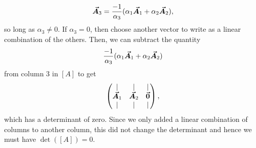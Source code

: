 \documentclass[12pt]{article} %
\begin{document}
\begin{solution}
\begin{enumerate}[(a)]
\[
\boldsymbol{\vec{A}}_3 = \frac{-1}{\alpha_3} (\alpha_1 \boldsymbol{\vec{A}}_1 + \alpha_2 \boldsymbol{\vec{A}}_2),
\]
so long as $\alpha_3\neq 0$.  If $\alpha_3 = 0$, then choose another vector to write as a linear combination of the others. Then, we can subtract the quantity 
\[
\frac{-1}{\alpha_3} (\alpha_1 \boldsymbol{\vec{A}}_1 + \alpha_2 \boldsymbol{\vec{A}}_2)
\]
from column 3 in $[A]$ to get
\[
\begin{pmatrix} \vert & \vert & \vert \\ \boldsymbol{\vec{A}}_1 & \boldsymbol{\vec{A}}_2 & \boldsymbol{\vec{0}} \\ \vert & \vert & \vert \end{pmatrix},
\]
which has a determinant of zero. Since we only added a linear combination of columns to another column, this did not change the determinant and hence we must have $\det([A])=0$.
\end{enumerate}
\end{solution}
\end{document}
